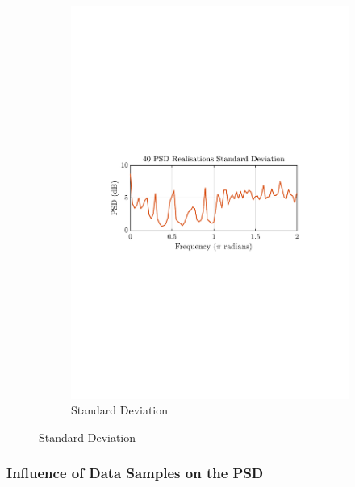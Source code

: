 \documentclass[12pt]{article}
\begin{document}
\begin{figure}[H]
\begin{subfigure}{0.49\textwidth}
			\includegraphics[trim={2.2cm 11.2cm 3.15cm  11.2cm}, clip, width=\textwidth]{../MATLAB/figures/q1_3c_fig02.pdf} 
			\captionsetup{justification=centering}
			\caption{Standard Deviation}
		\end{subfigure}
		\label{fig: 1-3c}
	\end{figure}

	\subsubsection{Influence of Data Samples on the PSD}
	
\end{document}

